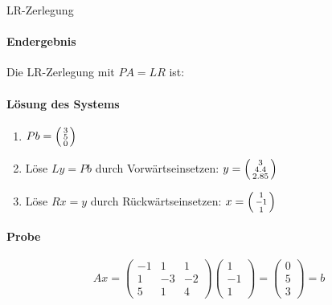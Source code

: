 \begin{example2}[breakable]{LR-Zerlegung}
\paragraph{Endergebnis}
Die LR-Zerlegung mit $PA = LR$ ist:
\vspace{2mm}\\

\paragraph{Lösung des Systems}
\begin{enumerate}
    \item $Pb = \begin{psmallmatrix} 3\\ 5\\ 0 \end{psmallmatrix}$
    \item Löse $Ly = Pb$ durch Vorwärtseinsetzen:
    $y = \begin{psmallmatrix} 3\\ 4.4\\ 2.85 \end{psmallmatrix}$
    \item Löse $Rx = y$ durch Rückwärtseinsetzen:
    $x = \begin{psmallmatrix} 1\\ -1\\ 1 \end{psmallmatrix}$
\end{enumerate}

\paragraph{Probe}
$$Ax = \begin{pmatrix}
-1 & 1 & 1\\
1 & -3 & -2\\
5 & 1 & 4
\end{pmatrix} \begin{pmatrix} 1\\ -1\\ 1 \end{pmatrix} = \begin{pmatrix} 0\\ 5\\ 3 \end{pmatrix} = b$$
\end{example2}

